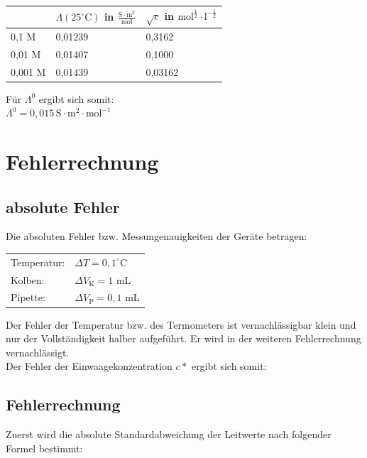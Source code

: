 \documentclass[12pt,a4paper,titlepage,headinclude,bibtotoc]{scrartcl}
\begin{document}
\begin{table} [h]
\centering 
\begin{tabular}{|p{4cm}||p{4cm}|p{4cm}|}
\hline
& $\mathit{\Lambda}(25^\circ\text{C})$ in $\frac{\mathrm{S} \cdot \mathrm{m^2}}{\mathrm{mol}}$ & $\sqrt{c}$ in $\mathrm{mol^{\frac{1}{2}}} \cdot \mathrm{l^{- \frac{1}{2}}}$\\
\hline
0,1 M & 0,01239 & 0,3162 \\
\hline
0,01 M & 0,01407 & 0,1000 \\
\hline
0,001 M & 0,01439 & 0,03162 \\
\hline
\end{tabular}
\end{table}

Für $\mathit{\Lambda^0}$ ergibt sich somit:\\
$\mathit{\Lambda^0} = 0,015\, \mathrm{S} \cdot \mathrm{m^2} \cdot \mathrm{mol^{-1}}$\\

\newpage 

\section{Fehlerrechnung}

\subsection{absolute Fehler}
Die absoluten Fehler bzw. Messungenauigkeiten der Geräte betragen:\\

\begin{table} [h]
\centering 
\begin{tabular}{p{4cm}p{4cm}}
Temperatur: & $\Delta T = 0,1^\circ\text{C}$ \\
Kolben: &$\Delta V_\mathrm{K}= 1$ mL   \\
Pipette: &  $\Delta V_\mathrm{P} =0,1$ mL \\
\end{tabular}
\end{table}

Der Fehler der Temperatur bzw. des Termometers ist vernachlässigbar klein und nur der Vollständigkeit halber aufgeführt. Er wird in der weiteren Fehlerrechnung vernachlässigt.\\
 Der Fehler der Einwaagekonzentration $c*$ ergibt sich somit:\\
 
 


\subsection{Fehlerrechnung}
Zuerst wird die absolute Standardabweichung der Leitwerte nach folgender Formel bestimmt:\\
\end{document}
